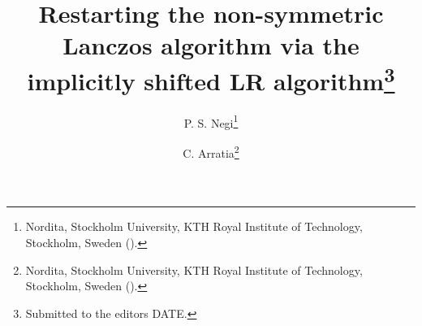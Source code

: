

\usepackage{lipsum}
\usepackage{amsfonts}
\usepackage{graphicx}
\usepackage{epstopdf}
\usepackage{amsmath}
\usepackage{listings}
\usepackage{algpseudocode}%
\usepackage{placeins}
\ifpdf
\else
\fi

\newcommand{\creflastconjunction}{, and~}



\title{Restarting the non-symmetric Lanczos algorithm via the implicitly shifted LR algorithm\thanks{Submitted to the editors DATE.
}}

\author{P. S. Negi\thanks{Nordita, Stockholm University, KTH Royal Institute of Technology, Stockholm, Sweden  ().}
\and C. Arratia\thanks{Nordita, Stockholm University, KTH Royal Institute of Technology, Stockholm, Sweden ().}
}

\usepackage{amsopn}
\DeclareMathOperator{\diag}{diag}


